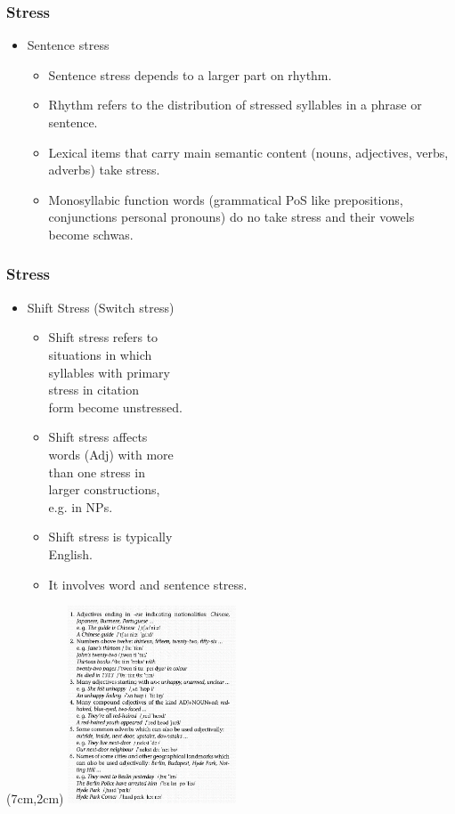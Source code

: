 \documentclass[12pt, table]{beamer}
\begin{document}
\begin{frame}
\frametitle{Stress}
\begin{itemize}
\item Sentence stress
\begin{itemize}
\item Sentence stress depends to a larger part on rhythm. 
\item Rhythm refers to the distribution of stressed syllables in a phrase or sentence.
\item Lexical items that carry main semantic content (nouns, adjectives, verbs, adverbs) take stress. 
\item Monosyllabic function words (grammatical PoS like prepositions, conjunctions personal pronouns) do no take stress and their vowels become schwas.	
\end{itemize}
\end{itemize}
\end{frame}

\begin{frame}
\frametitle{Stress}
\begin{itemize}
\item Shift Stress (Switch stress)
\begin{itemize}
\item Shift stress refers to \\ 
situations in which \\ 
syllables with primary \\ 
stress in citation \\ 
form become unstressed.
\item Shift stress affects \\ 
words (Adj) with more\\ 
than one stress in \\ 
larger constructions, \\ 
e.g. in NPs.
\item Shift stress is typically \\ 
English.
\item It involves word and sentence stress.
\end{itemize}
\end{itemize}
\begin{textblock*}{3cm}(7cm,2cm)
\includegraphics[width=5cm]{images/shiftstress.png}
\end{textblock*}
\end{frame}
\end{document}
